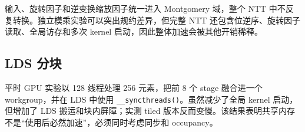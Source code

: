输入、旋转因子和逆变换缩放因子统一进入 Montgomery 域，整个 NTT 中不反复转换。独立模乘实验可以突出规约差异，但完整 NTT 还包含位逆序、旋转因子读取、全局访存和多次 kernel 启动，因此整体加速会被其他开销稀释。

\subsection{LDS 分块}

平时 GPU 实验以 128 线程处理 256 元素，把前 8 个 stage 融合进一个 workgroup，并在 LDS 中使用 \texttt{\_\_syncthreads()}。虽然减少了全局 kernel 启动，但增加了 LDS 搬运和块内屏障；实测 tiled 版本反而变慢。该结果表明共享内存不是“使用后必然加速”，必须同时考虑同步和 occupancy。
